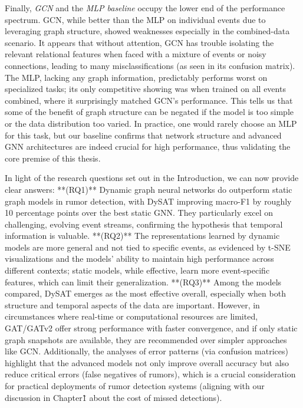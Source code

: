 \documentclass{cshonours}
\begin{document}
Finally, \emph{GCN} and the \emph{MLP baseline} occupy the lower end of the performance spectrum. GCN, while better than the MLP on individual events due to leveraging graph structure, showed weaknesses especially in the combined-data scenario. It appears that without attention, GCN has trouble isolating the relevant relational features when faced with a mixture of events or noisy connections, leading to many misclassifications (as seen in its confusion matrix). The MLP, lacking any graph information, predictably performs worst on specialized tasks; its only competitive showing was when trained on all events combined, where it surprisingly matched GCN’s performance. This tells us that some of the benefit of graph structure can be negated if the model is too simple or the data distribution too varied. In practice, one would rarely choose an MLP for this task, but our baseline confirms that network structure and advanced GNN architectures are indeed crucial for high performance, thus validating the core premise of this thesis.

In light of the research questions set out in the Introduction, we can now provide clear answers: **(RQ1)** Dynamic graph neural networks do outperform static graph models in rumor detection, with DySAT improving macro-F1 by roughly 10 percentage points over the best static GNN. They particularly excel on challenging, evolving event streams, confirming the hypothesis that temporal information is valuable. **(RQ2)** The representations learned by dynamic models are more general and not tied to specific events, as evidenced by t-SNE visualizations and the models’ ability to maintain high performance across different contexts; static models, while effective, learn more event-specific features, which can limit their generalization. **(RQ3)** Among the models compared, DySAT emerges as the most effective overall, especially when both structure and temporal aspects of the data are important. However, in circumstances where real-time or computational resources are limited, GAT/GATv2 offer strong performance with faster convergence, and if only static graph snapshots are available, they are recommended over simpler approaches like GCN. Additionally, the analyses of error patterns (via confusion matrices) highlight that the advanced models not only improve overall accuracy but also reduce critical errors (false negatives of rumors), which is a crucial consideration for practical deployments of rumor detection systems (aligning with our discussion in Chapter\~1 about the cost of missed detections).
\end{document}
